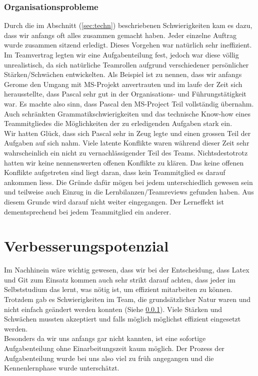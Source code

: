 \subsubsection {Organisationsprobleme} \label{sec:orgprob}
Durch die im Abschnitt (\ref{sec:techn}) beschriebenen Schwierigkeiten kam es dazu, dass wir anfangs oft alles zusammen gemacht haben. Jeder einzelne Auftrag wurde zusammen sitzend erledigt. Dieses Vorgehen war natürlich sehr ineffizient. Im Teamvertrag legten wir eine Aufgabenteilung fest, jedoch war diese völlig unrealistisch, da sich natürliche Teamrollen aufgrund verschiedener persönlicher Stärken/Schwächen entwickelten. Als Beispiel ist zu nennen, dass wir anfangs Gerome den Umgang mit MS-Projekt anvertrauten und im laufe der Zeit sich herausstellte, dass Pascal sehr gut in der Organisations- und Führungstätigkeit war. Es machte also sinn, dass Pascal den MS-Project Teil vollständig übernahm. Auch schränkten Grammatikschwierigkeiten und das technische Know-how eines Teammitgliedes die Möglichkeiten der zu erledigenden Aufgaben stark ein. \\
Wir hatten Glück, dass sich Pascal sehr in Zeug legte und einen grossen Teil der Aufgaben auf sich nahm. Viele latente Konflikte waren während dieser Zeit sehr wahrscheinlich ein nicht zu vernachlässigender Teil des Teams. Nichtsdestotrotz hatten wir keine nennenswerten offenen Konflikte zu klären. Das keine offenen Konflikte aufgetreten sind liegt daran, dass kein Teammitglied es darauf ankommen liess. Die Gründe dafür mögen bei jedem unterschiedlich gewesen sein und teilweise auch Einzug in die Lernbilanzen/Teamreviews gefunden haben. Aus diesem Grunde wird darauf nicht weiter eingegangen. Der Lerneffekt ist dementsprechend bei jedem Teammitglied ein anderer.

\section{Verbesserungspotenzial}

Im Nachhinein wäre wichtig gewesen, dass wir bei der Entscheidung, dass Latex und Git zum Einsatz kommen auch sehr strikt darauf achten, dass jeder im Selbststudium das lernt, was nötig ist, um effizient mitarbeiten zu können. \\
Trotzdem gab es Schwierigkeiten im Team, die grundsätzlicher Natur waren und nicht einfach geändert werden konnten (Siehe \ref{sec:orgprob}). Viele Stärken und Schwächen mussten akzeptiert und falls möglich möglichst effizient eingesetzt werden. \\
Besonders da wir uns anfangs gar nicht kannten, ist eine sofortige Aufgabenteilung ohne Einarbeitungszeit kaum möglich. Der Prozess der Aufgabenteilung wurde bei uns also viel zu früh angegangen und die Kennenlernphase wurde unterschätzt. 